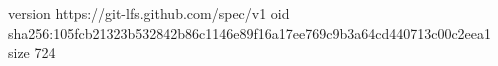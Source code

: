 version https://git-lfs.github.com/spec/v1
oid sha256:105fcb21323b532842b86c1146e89f16a17ee769c9b3a64cd440713c00c2eea1
size 724
